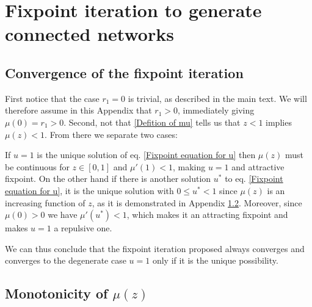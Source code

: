 \documentclass[
11pt, %
english, %
singlespacing, %
nolistspacing, %
liststotoc, %
headsepline, %
]{MastersDoctoralThesis} %
\begin{document}

\appendix %

\chapter{Fixpoint iteration to generate connected networks}
\section{Convergence of the fixpoint iteration}
\label{Appendix: Fixpoint convergence}

First notice that the case $r_1 = 0$ is trivial, as described in the main text. We will therefore assume in this Appendix that $r_1 > 0$, immediately giving $\mu(0) = r_1 > 0$. Second, not that \eqref{Defition of mu} tells us that $z < 1$ implies $\mu(z) < 1$. From there we separate two cases:

If $u = 1$ is the unique solution of eq. \eqref{Fixpoint equation for u} then $\mu(z)$ must be continuous for $z \in [0, 1]$ and $\mu'(1) < 1$, making $u = 1$ and attractive fixpoint. On the other hand if there is another solution $u^*$ to eq. \eqref{Fixpoint equation for u}, it is the unique solution with $0 \leq u^* < 1$ since $\mu(z)$ is an increasing function of $z$, as it is demonstrated in Appendix \ref{Appendix: Monotonicity}. Moreover, since $\mu(0) > 0$ we have $\mu'(u^*) < 1$, which makes it an attracting fixpoint and makes $u = 1$ a repulsive one.

We can thus conclude that the fixpoint iteration proposed always converges and converges to the degenerate case $u = 1$ only if it is the unique possibility.

\section{Monotonicity of $\mu(z)$}
\label{Appendix: Monotonicity}
\end{document}
